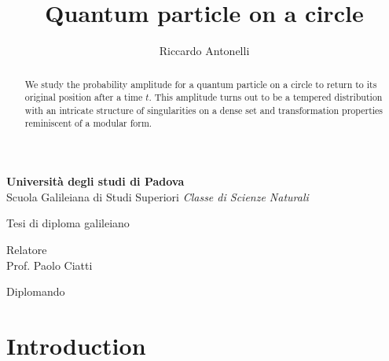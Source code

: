 \documentclass{article}
\title{Quantum particle on a circle}
\author{Riccardo Antonelli}
\begin{document}
\makeatletter
\begin{center} \Large
    \vfill
    {\LARGE \textbf{Universit\`a degli studi di Padova}}\\
    \vspace{30pt}
    Scuola Galileiana di Studi Superiori \vfill
    \emph{Classe di Scienze Naturali}\\ \vfill

    Tesi di diploma galileiano\\ \vfill

    {\Huge \bfseries \@title }
    \vfill

\end{center}

\vspace{100pt}

\begin{multicols}{2} \Large
    \begin{flushleft}
    Relatore\\
    Prof. Paolo Ciatti
\end{flushleft}

    \columnbreak

    \begin{flushright}
    Diplomando\\
    \@author
\end{flushright}

\end{multicols}

\vfill


\newpage

\maketitle

\begin{abstract}
    We study the probability amplitude for a quantum particle on a circle to return to its original position after a time $t$. This amplitude turns out to be a tempered distribution with an intricate structure of singularities on a dense set and transformation properties reminiscent of a modular form.
\end{abstract}

\tableofcontents

\pagebreak

\section{Introduction}
\end{document}
